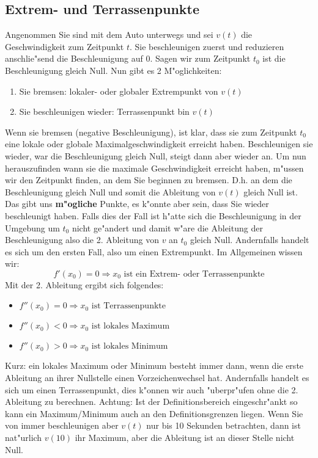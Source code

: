 \subsection{Extrem- und Terrassenpunkte}
Angenommen Sie sind mit dem Auto unterwegs und sei $v(t)$ die Geschwindigkeit zum Zeitpunkt $t$. Sie beschleunigen zuerst und reduzieren anschlie"send die Beschleunigung auf $0$. Sagen wir zum Zeitpunkt $t_0$ ist die Beschleunigung gleich Null. Nun gibt es 2 M"oglichkeiten:
\begin{enumerate}
\item Sie bremsen: lokaler- oder globaler Extrempunkt von $v(t)$
\item Sie beschleunigen wieder: Terrassenpunkt bin $v(t)$
\end{enumerate}
Wenn sie bremsen (negative Beschleunigung), ist klar, dass sie zum Zeitpunkt $t_0$ eine lokale oder globale Maximalgeschwindigkeit erreicht haben. Beschleunigen sie wieder, war die Beschleunigung gleich Null, steigt dann aber wieder an. Um nun herauszufinden wann sie die maximale Geschwindigkeit erreicht haben, m"ussen wir den Zeitpunkt finden, an dem Sie beginnen zu bremsen. D.h. an dem die Beschleunigung gleich Null und somit die Ableitung von $v(t)$ gleich Null ist. Das gibt uns \textbf{m"ogliche} Punkte, es k"onnte aber sein, dass Sie wieder beschleunigt haben. Falls dies der Fall ist h"atte sich die Beschleunigung in der Umgebung um $t_0$ nicht ge"andert und damit w"are die Ableitung der Beschleunigung also die 2. Ableitung von $v$ an $t_0$ gleich Null. Andernfalls handelt es sich um den ersten Fall, also um einen Extrempunkt. Im Allgemeinen wissen wir:
\begin{equation*}
f'(x_0) = 0 \Rightarrow x_0 \text{ ist ein Extrem- oder Terrassenpunkte}
\end{equation*}
Mit der 2. Ableitung ergibt sich folgendes:
\begin{itemize}
\item $f''(x_0) = 0 \Rightarrow x_0 \text{ ist Terrassenpunkte}$ 
\item $f''(x_0) < 0 \Rightarrow x_0 \text{ ist lokales Maximum }$
\item $f''(x_0) > 0 \Rightarrow x_0 \text{ ist lokales Minimum}$
\end{itemize}
Kurz: ein lokales Maximum oder Minimum besteht immer dann, wenn die erste Ableitung an ihrer Nullstelle einen Vorzeichenwechsel hat. Andernfalls handelt es sich um einen Terrassenpunkt, dies k"onnen wir auch "uberpr"ufen ohne die 2. Ableitung zu berechnen. Achtung: Ist der Definitionsbereich eingeschr"ankt so kann ein Maximum/Minimum auch an den Definitionsgrenzen liegen. Wenn Sie von immer beschleunigen aber $v(t)$ nur bis 10 Sekunden betrachten, dann ist nat"urlich $v(10)$ ihr Maximum, aber die Ableitung ist an dieser Stelle nicht Null.
